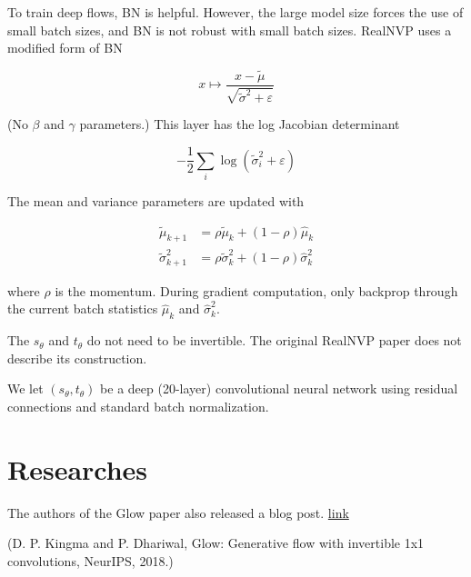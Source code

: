 \documentclass{report}
\begin{document}
\begin{concept}
    To train deep flows, BN is helpful. However, the large model size forces the use of small batch sizes, and BN is not robust with small batch sizes. RealNVP uses a modified form of BN

    $$
    x \mapsto \frac{x-\tilde{\mu}}{\sqrt{\tilde{\sigma}^{2}+\varepsilon}}
    $$

    (No $\beta$ and $\gamma$ parameters.) This layer has the log Jacobian determinant

    $$
    -\frac{1}{2} \sum_{i} \log \left(\tilde{\sigma}_{i}^{2}+\varepsilon\right)
    $$

    The mean and variance parameters are updated with

    $$
    \begin{aligned}
    \tilde{\mu}_{k+1} & =\rho \tilde{\mu}_{k}+(1-\rho) \hat{\mu}_{k} \\
    \tilde{\sigma}_{k+1}^{2} & =\rho \tilde{\sigma}_{k}^{2}+(1-\rho) \hat{\sigma}_{k}^{2}
    \end{aligned}
    $$

    where $\rho$ is the momentum. During gradient computation, only backprop through the current batch statistics $\hat{\mu}_{k}$ and $\hat{\sigma}_{k}^{2}$.
\end{concept}

\begin{concept}
    The $s_{\theta}$ and $t_{\theta}$ do not need to be invertible. The original RealNVP paper does not describe its construction.

    We let $\left(s_{\theta}, t_{\theta}\right)$ be a deep (20-layer) convolutional neural network using residual connections and standard batch normalization.
\end{concept}

\section{Researches}

\begin{definition}
    The authors of the Glow paper also released a blog post.
    \href{https://openai.com/blog/glow/}{link}

    (D. P. Kingma and P. Dhariwal, Glow: Generative flow with invertible 1x1 convolutions, NeurIPS, 2018.)
\end{definition}
\end{document}

